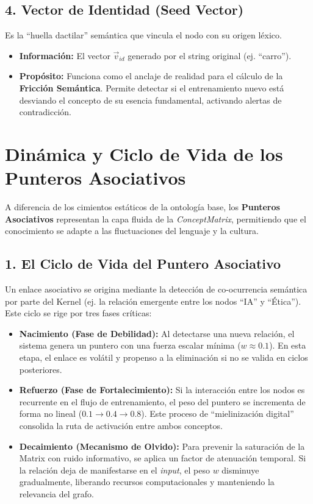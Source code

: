 \documentclass[12pt]{article}
\begin{document}
\subsection{4. Vector de Identidad (Seed Vector)}
Es la ``huella dactilar'' semántica que vincula el nodo con su origen léxico.
\begin{itemize}
    \item \textbf{Información:} El vector $\vec{v}_{id}$ generado por el string original (ej. ``carro'').
    \item \textbf{Propósito:} Funciona como el anclaje de realidad para el cálculo de la \textbf{Fricción Semántica}. Permite detectar si el entrenamiento nuevo está desviando el concepto de su esencia fundamental, activando alertas de contradicción.
\end{itemize}


\section{Dinámica y Ciclo de Vida de los Punteros Asociativos}

A diferencia de los cimientos estáticos de la ontología base, los \textbf{Punteros Asociativos} representan la capa fluida de la \textit{ConceptMatrix}, permitiendo que el conocimiento se adapte a las fluctuaciones del lenguaje y la cultura.

\subsection{1. El Ciclo de Vida del Puntero Asociativo}
Un enlace asociativo se origina mediante la detección de co-ocurrencia semántica por parte del Kernel (ej. la relación emergente entre los nodos ``IA'' y ``Ética''). Este ciclo se rige por tres fases críticas:

\begin{itemize}
    \item \textbf{Nacimiento (Fase de Debilidad):} Al detectarse una nueva relación, el sistema genera un puntero con una fuerza escalar mínima ($w \approx 0.1$). En esta etapa, el enlace es volátil y propenso a la eliminación si no se valida en ciclos posteriores.
    \item \textbf{Refuerzo (Fase de Fortalecimiento):} Si la interacción entre los nodos es recurrente en el flujo de entrenamiento, el peso del puntero se incrementa de forma no lineal ($0.1 \to 0.4 \to 0.8$). Este proceso de ``mielinización digital'' consolida la ruta de activación entre ambos conceptos.
    \item \textbf{Decaimiento (Mecanismo de Olvido):} Para prevenir la saturación de la Matrix con ruido informativo, se aplica un factor de atenuación temporal. Si la relación deja de manifestarse en el \textit{input}, el peso $w$ disminuye gradualmente, liberando recursos computacionales y manteniendo la relevancia del grafo.
\end{itemize}
\end{document}

